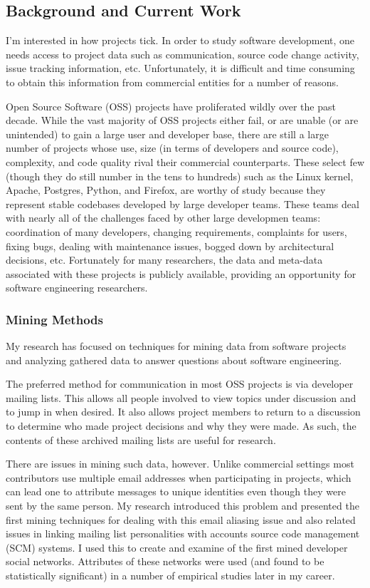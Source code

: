 \documentclass[10pt]{article}
\newcommand\Section[1]{\section*{#1}}
\newcommand\Subsection[1]{\subsubsection*{#1}}
\begin{document}
\begin{small}
\Section{Background and Current Work}

I'm interested in how projects tick.  In order to study software development,
one needs access to project data such as communication, source code change
activity, issue tracking information, etc.  Unfortunately, it is difficult 
and time consuming to obtain this information from commercial entities for
a number of reasons.

Open Source Software (OSS) projects have proliferated wildly over the past
decade.  While the vast majority of OSS projects either fail, or are unable (or
are unintended) to gain a large user and developer base, there are still a
large number of projects whose use, size (in terms of developers and source
code), complexity, and code quality rival their commercial counterparts.  These
select few (though they do still number in the tens to hundreds) such as the
Linux kernel, Apache, Postgres, Python, and Firefox, are worthy of study
because they represent stable codebases developed by large developer teams.
These teams deal with nearly all of the challenges faced by other large
developmen teams: coordination of many developers, changing requirements,
complaints for users, fixing bugs, dealing with maintenance issues, bogged down
by architectural decisions, etc.  Fortunately for many researchers, the data and
meta-data associated with these projects is publicly available, providing
an opportunity for software engineering researchers.

\Subsection{Mining Methods}

My research has focused on techniques for mining data from software projects
and analyzing gathered data to answer questions about software engineering.

The preferred method for communication in most OSS projects is via
developer mailing lists.  This allows all people involved to view
topics under discussion and to jump in when desired.  It also allows
project members to return to a discussion to determine who made project
decisions and why they were made.  As such, the contents of these archived
mailing lists are useful for research.

There are issues in mining such data, however.  Unlike commercial settings most
contributors use multiple email addresses when participating in projects, which
can lead one to attribute messages to unique identities even though they were
sent by the same person.  My research introduced this problem and presented the
first mining techniques for dealing with this email aliasing issue and also
related issues in linking mailing list personalities with accounts source code
management (SCM) systems.  I used this to create and examine of the
first mined developer social networks.  Attributes of these networks were
used (and found to be statistically significant) in a number of empirical studies
later in my career.


\end{small}
\end{document}
